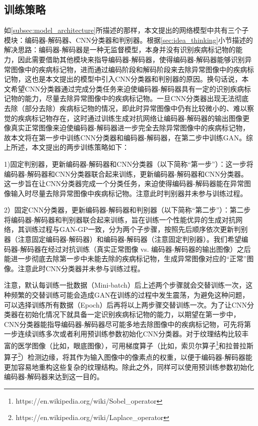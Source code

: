\subsection{训练策略}\label{subsec:traing_stragies}
如\ref{subsec:model_architecture}所描述的那样，本文提出的网络模型中共有三个子模块：编码器-解码器、CNN分类器和判别器。根据\ref{sec:idea_thinking}小节描述的解决思路：编码器-解码器是一种无监督模型，本身并没有识别疾病标记物的能力，因此需要借助其他模块来指导编码器-解码器，使得编码器-解码器能够识别异常图像中的疾病标记物，进而通过编码阶段和解码阶段来去除异常图像中的疾病标记物，这也是本文提出的模型中引入CNN分类器和判别器的原因。换句话说，本文希望CNN分类器通过完成分类任务来迫使编码器-解码器具有一定的识别疾病标记物的能力，尽量去除异常图像中的疾病标记物。一旦CNN分类器出现无法彻底去除（部分去除）疾病标记物的情况，即此时异常图像中仍有比较微小的、难以察觉的疾病标记物存在，这时通过训练生成对抗网络让编码器-解码器的输出图像更像真实正常图像来迫使编码器-解码器进一步完全去除异常图像中的疾病标记物，故本文将在第一步中训练CNN分类器和编码器-解码器，在第二步中训练GAN。综上所述，本文提出的两步训练策略如下：

1)固定判别器，更新编码器-解码器和CNN分类器（以下简称“第一步”）：这一步将编码器-解码器和CNN分类器联合起来训练，更新编码器-解码器和CNN分类器。这一步旨在让CNN分类器完成一个分类任务，来迫使得编码器-解码器能在异常图像输入时尽量去除异常图像中疾病标记物。注意此时判别器并未参与训练过程。

2）固定CNN分类器，更新编码器-解码器和判别器（以下简称“第二步”）：第二步将编码器-解码器和判别器联合起来训练，旨在训练一个性能优异的生成对抗网络，其训练过程与GAN-GP一致，分为两个子步骤，按照先后顺序依次更新判别器（注意固定编码器-解码器）和编码器-解码器（注意固定判别器）。我们希望编码器-解码器在经过对抗训练（真实正常图像 vs. 编码器-解码器的输出图像）之后能进一步彻底去除第一步中未能去除的疾病标记物，生成异常图像对应的“正常”图像。注意此时CNN分类器并未参与训练过程。

注意，默认每训练一批数据（Mini-batch）后上述两个步骤就会交替训练一次，这种频繁的交替训练可能会造成GAN在训练的过程中发生震荡，为避免这种问题，可以选择训练所有数据（Epoch）后再将以上两步骤交替训练一次。为了让CNN分类器在初始化情况下就具备一定识别疾病标记物的能力，以期望在第一步中，CNN分类器能指导编码器-解码器尽可能多地去除图像中的疾病标记物，可先将第一步连续训练多次或者利用预训练参数初始化CNN分类器。对于纹理结构比较丰富的医学图像（比如，眼底图像），可用梯度算子（比如，索贝尔算子\footnote{https://en.wikipedia.org/wiki/Sobel\_operator}和拉普拉斯算子\footnote{https://en.wikipedia.org/wiki/Laplace\_operator}）检测边缘，将其作为输入图像中的像素点的权重，以便于编码器-解码器能更加容易地重构这些复杂的纹理结构。除此之外，同样可以使用预训练参数初始化编码器-解码器来达到这一目的。

